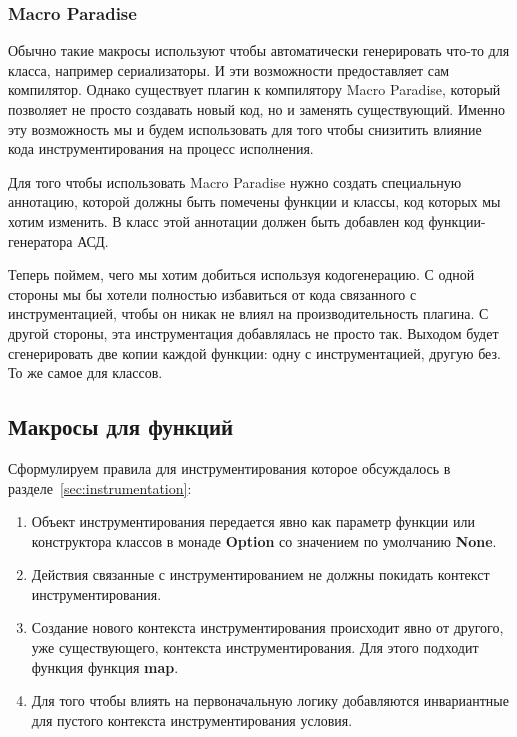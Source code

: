 \subsubsection{Macro Paradise}

Обычно такие макросы используют чтобы автоматически генерировать что-то для
класса, например сериализаторы.
И эти возможности предоставляет сам компилятор.
Однако существует плагин к компилятору Macro Paradise, который позволяет не
просто создавать новый код, но и заменять существующий.
Именно эту возможность мы и будем использовать для того чтобы снизитить влияние
кода инструментирования на процесс исполнения.

Для того чтобы использовать Macro Paradise нужно создать специальную аннотацию,
которой должны быть помечены функции и классы, код которых мы хотим изменить.
В класс этой аннотации должен быть добавлен код функции-генератора АСД.

Теперь поймем, чего мы хотим добиться используя кодогенерацию.
С одной стороны мы бы хотели полностью избавиться от кода связанного с инструментацией,
чтобы он никак не влиял на производительность плагина.
С другой стороны, эта инструментация добавлялась не просто так.
Выходом будет сгенерировать две копии каждой функции: одну с инструментацией,
другую без.
То же самое для классов.

\subsection{Макросы для функций}
\label{sec:macroFunction}

Сформулируем правила для инструментирования которое обсуждалось в
разделе~\ref{sec:instrumentation}:
\begin{enumerate}
  \item
  \label{itm:ins-constructor}
  Объект инструментирования передается явно как параметр функции или
  конструктора классов в монаде \textbf{Option} со значением по умолчанию
  \textbf{None}.
  \item
  \label{itm:ins-context}
  Действия связанные с инструментированием не должны покидать контекст
  инструментирования.
  \item
  \label{itm:ins-creating}
  Создание нового контекста инструментирования происходит явно от другого,
  уже существующего, контекста инструментирования.
  Для этого подходит функция функция \textbf{map}.
  \item
  \label{itm:ins-logic}
  Для того чтобы влиять на первоначальную логику добавляются
  инвариантные для пустого контекста инструментирования условия.
\end{enumerate}

